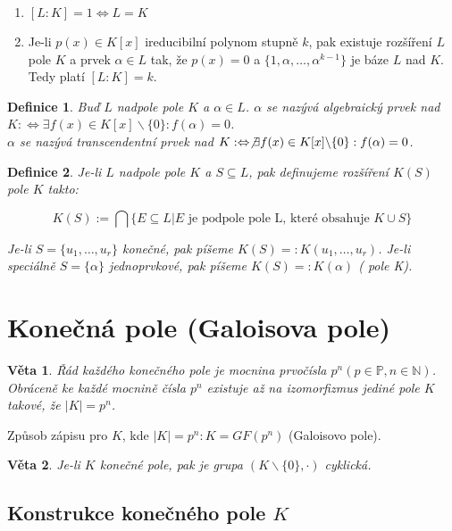 \documentclass[a4paper, 11pt]{report}
\newtheorem{mydef}{Definice}[chapter]
\newtheorem{veta}{Věta}[chapter]
\begin{document}
\begin{enumerate}
	\item $[ L : K] = 1 \Leftrightarrow L = K$
	\item Je-li $p(x) \in K[x]$ ireducibilní polynom stupně $k$, pak existuje rozšíření $L$ pole $K$ a prvek $\alpha \in L$ tak, že $p(x) = 0$ a $\{1, \alpha, \dots, \alpha^{k-1}\}$ je báze $L$ nad $K$. Tedy platí $ [L : K] = k$.
\end{enumerate}

\begin{mydef}
Buď $L$ nadpole pole $K$ a $\alpha \in L$.
$\alpha$ se nazývá \emph{algebraický} prvek nad $K: \Leftrightarrow \exists f(x) \in K[x] \backslash \{0\}: f(\alpha) = 0$. \\
$\alpha$ se nazývá \emph{transcendentní} prvek nad $K: \Leftrightarrow \not\exists f(x) \in K[x] \backslash \{0\}: f(\alpha) = 0$.
\end{mydef}

\begin{mydef}
Je-li $L$ nadpole pole $K$ a $S \subseteq L$, pak definujeme rozšíření $K(S)$ pole $K$ takto:

$$K(S) := \bigcap \{E \subseteq L | E \text{ je podpole pole L, které obsahuje } K \cup S\}$$

Je-li $S = \{u_1, \dots, u_r\}$ konečné, pak píšeme $K(S) =: K(u_1, \dots, u_r)$. Je-li speciálně $S = \{\alpha\}$ jednoprvkové, pak píšeme $K(S) =: K(\alpha)$ ( pole K).
\end{mydef}

\section{Konečná pole (Galoisova pole)}

\begin{veta}
Řád každého konečného pole je mocnina prvočísla $p^n (p \in \mathbb{P}, n \in \mathbb{N})$. Obráceně ke každé mocnině čísla $p^n$ existuje až na izomorfizmus jediné pole $K$ takové, že $|K| = p^n$.
\end{veta}
Způsob zápisu pro $K$, kde $|K| = p^n: K = GF(p^n)$ (Galoisovo pole).

\begin{veta}
Je-li $K$ konečné pole, pak je grupa $(K \backslash \{0\}, \cdot)$ cyklická.
\end{veta}

\subsection{Konstrukce konečného pole $K$}
\end{document}
